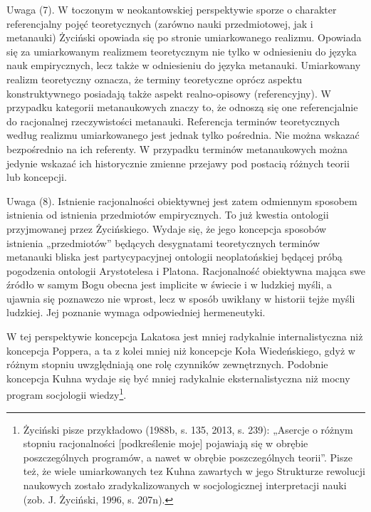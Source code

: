 \documentclass{article}
\begin{document}
Uwaga (7). W toczonym w neokantowskiej perspektywie sporze o charakter referencjalny pojęć teoretycznych (zarówno nauki
przedmiotowej, jak i metanauki) Życiński opowiada się po stronie umiarkowanego realizmu. Opowiada się za umiarkowanym
realizmem teoretycznym nie tylko w odniesieniu do języka nauk empirycznych, lecz także w odniesieniu do języka
metanauki. Umiarkowany realizm teoretyczny oznacza, że terminy teoretyczne oprócz aspektu konstruktywnego posiadają
także aspekt realno-opisowy (referencyjny). W przypadku kategorii metanaukowych znaczy to, że odnoszą się one
referencjalnie do racjonalnej rzeczywistości metanauki. Referencja terminów teoretycznych według realizmu umiarkowanego
jest jednak tylko pośrednia. Nie można wskazać bezpośrednio na ich referenty. W przypadku terminów metanaukowych można
jedynie wskazać ich historycznie zmienne przejawy pod postacią różnych teorii lub koncepcji.

Uwaga (8). Istnienie racjonalności obiektywnej jest zatem odmiennym sposobem istnienia od istnienia przedmiotów
empirycznych. To już kwestia ontologii przyjmowanej przez Życińskiego. Wydaje się, że jego koncepcja sposobów istnienia
„przedmiotów” będących desygnatami teoretycznych terminów metanauki bliska jest partycypacyjnej ontologii
neoplatońskiej będącej próbą pogodzenia ontologii Arystotelesa i Platona. Racjonalność obiektywna mająca swe źródło w
samym Bogu obecna jest implicite w świecie i w ludzkiej myśli, a ujawnia się poznawczo nie wprost, lecz w sposób
uwikłany w historii tejże myśli ludzkiej. Jej poznanie wymaga odpowiedniej hermeneutyki.

W tej perspektywie koncepcja Lakatosa jest mniej radykalnie internalistyczna niż koncepcja Poppera, a ta z kolei mniej
niż koncepcje Koła Wiedeńskiego, gdyż w różnym stopniu uwzględniają one rolę czynników zewnętrznych. Podobnie koncepcja
Kuhna wydaje się być mniej radykalnie eksternalistyczna niż mocny program socjologii wiedzy\footnote{Życiński pisze
przykładowo \label{ref:RNDMFFbOpIuQe}(1988b, s. 135, 2013, s. 239): „Asercje o różnym stopniu racjonalności
[podkreślenie moje] pojawiają się w obrębie poszczególnych programów, a nawet w obrębie poszczególnych teorii”.  Pisze
też, że wiele umiarkowanych tez Kuhna zawartych w jego Strukturze rewolucji naukowych zostało zradykalizowanych w
socjologicznej interpretacji nauki \label{ref:RND7QncKOKY2H}(zob. J. Życiński, 1996, s. 207n).}.
\end{document}
